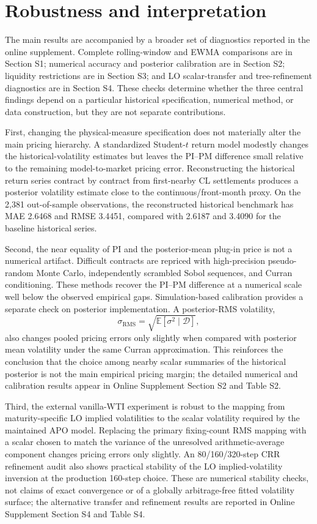 \section{Robustness and interpretation}\label{sec:short_robustness}

The main results are accompanied by a broader set of diagnostics reported in the online supplement. Complete rolling-window and EWMA comparisons are in Section S1; numerical accuracy and posterior calibration are in Section S2; liquidity restrictions are in Section S3; and LO scalar-transfer and tree-refinement diagnostics are in Section S4. These checks determine whether the three central findings depend on a particular historical specification, numerical method, or data construction, but they are not separate contributions.

First, changing the physical-measure specification does not materially alter the main pricing hierarchy. A standardized Student-\(t\) return model modestly changes the historical-volatility estimates but leaves the PI--PM difference small relative to the remaining model-to-market pricing error. Reconstructing the historical return series contract by contract from first-nearby CL settlements produces a posterior volatility estimate close to the continuous/front-month proxy. On the 2,381 out-of-sample observations, the reconstructed historical benchmark has MAE 2.6468 and RMSE 3.4451, compared with 2.6187 and 3.4090 for the baseline historical series.

Second, the near equality of PI and the posterior-mean plug-in price is not a numerical artifact. Difficult contracts are repriced with high-precision pseudo-random Monte Carlo, independently scrambled Sobol sequences, and Curran conditioning. These methods recover the PI--PM difference at a numerical scale well below the observed empirical gaps. Simulation-based calibration provides a separate check on posterior implementation. A posterior-RMS volatility,
\[
 \sigma_{\mathrm{RMS}}=\sqrt{\mathbb E[\sigma^2\mid\mathcal D]},
\]
also changes pooled pricing errors only slightly when compared with posterior mean volatility under the same Curran approximation. This reinforces the conclusion that the choice among nearby scalar summaries of the historical posterior is not the main empirical pricing margin; the detailed numerical and calibration results appear in Online Supplement Section S2 and Table S2.

Third, the external vanilla-WTI experiment is robust to the mapping from maturity-specific LO implied volatilities to the scalar volatility required by the maintained APO model. Replacing the primary fixing-count RMS mapping with a scalar chosen to match the variance of the unresolved arithmetic-average component changes pricing errors only slightly. An 80/160/320-step CRR refinement audit also shows practical stability of the LO implied-volatility inversion at the production 160-step choice. These are numerical stability checks, not claims of exact convergence or of a globally arbitrage-free fitted volatility surface; the alternative transfer and refinement results are reported in Online Supplement Section S4 and Table S4.

